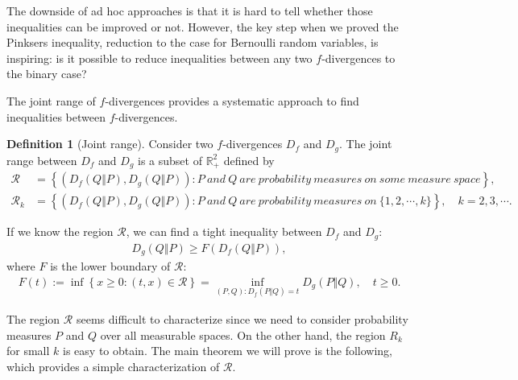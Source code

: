 \documentclass{article}
\numberwithin{equation}{section}
\newcommand{\bbR}{\mathbb{R}}
\renewcommand{\cal}{\mathcal}
\theoremstyle{plain}
\theoremstyle{definition}
\newtheorem{definition}[theorem]{Definition}
\begin{document}
The downside of ad hoc approaches is that it is hard to tell whether those inequalities can be improved or not. However, the key step when we proved the Pinksers inequality, reduction to the case for Bernoulli random variables, is inspiring: is it possible to reduce inequalities between any two $f$-divergences to the binary case?

The joint range of $f$-divergences provides a systematic approach to find inequalities between $f$-divergences.
\begin{definition}[Joint range]\label{jrdef}
Consider two $f$-divergences $D_f$ and $D_g$. The joint
range between $D_f$ and $D_g$ is a subset of $\bbR^2_+$ defined by
\begin{align*}
\cal{R}&=\left\{(D_f(Q\Vert P), D_g(Q\Vert P)): P\ and\ Q\ are\ probability\ measures\ on\ some\ measure\ space\right\},\\
\cal{R}_k&=\left\{(D_f(Q\Vert P), D_g(Q\Vert P)): P\ and\ Q\ are\ probability\ measures\ on\ \{1,2,\cdots,k\}\right\},\quad k=2,3,\cdots.
\end{align*}
\end{definition}
If we know the region $\cal{R}$, we can find a tight inequality between $D_f$ and $D_g$:
\begin{align*}
	D_g(Q\Vert P)\geq F(D_f(Q\Vert P)),
\end{align*}
where $F$ is the lower boundary of $\cal{R}$:
\begin{align*}
	F(t):=\inf\left\{x\geq 0:(t,x)\in\cal{R}\right\}=\inf_{(P,Q):D_f(P\Vert Q)=t}D_g(P\Vert Q),\quad t\geq 0.
\end{align*}

The region $\cal{R}$ seems difficult to characterize since we need to consider probability measures $P$ and $Q$ over all measurable spaces. On the other hand, the region $R_k$ for small $k$ is easy to obtain. The main theorem we will prove is the following, which provides a simple characterization of $\cal{R}$.
\end{document}
